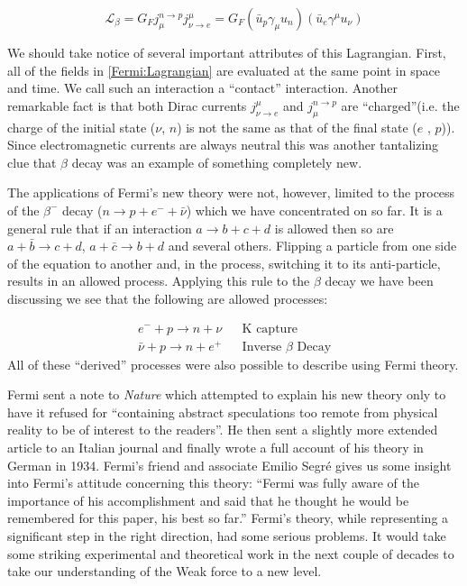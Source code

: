 \documentclass[12pt]{book}
\begin{document}
\begin{equation}\label{Fermi:Lagrangian}
 \mathcal{L}_{\beta}=G_{F}j_{\mu}^{n\rightarrow p}j_{\nu \rightarrow e}^{\mu}=G_{F}\left(\bar{u}_{p}\gamma_{\mu} u_{n}\right)\left(\bar{u}_{e}\gamma^{\mu} u_{\nu}\right)
\end{equation}

We should take notice of several important attributes of this Lagrangian. First, all of the fields in \ref{Fermi:Lagrangian} are evaluated at the same point in space and time. We call such an interaction a ``contact'' interaction. Another remarkable fact is that both Dirac currents $j_{\nu \rightarrow e}^{\mu}$ and $j_{\mu}^{n\rightarrow p}$ are ``charged''(i.e. the charge of the initial state ($\nu$, $n$) is not the same as that of the final state ($e$ , $p$)). Since electromagnetic currents are always neutral this was another tantalizing clue that $\beta$ decay was an example of something completely new\cite{renton}.

The applications of Fermi's new theory were not, however, limited to the process of the $\beta^{-}$ decay ($n\rightarrow p+e^{-}+\bar{\nu}$) which we have concentrated on so far. It is a general rule that if an interaction $a\rightarrow b+c+d$ is allowed then so are $a+\bar{b}\rightarrow c+d$, $a+\bar{c}\rightarrow b+d$ and several others. Flipping a particle from one side of the equation to another and, in the process, switching it to its anti-particle, results in an allowed process. Applying this rule to the $\beta$ decay we have been discussing we see that the following are allowed processes:

\begin{align}
 e^{-}+p \rightarrow n+\nu && \text{K capture} \\
 \bar{\nu}+p \rightarrow n+e^{+} && \text{Inverse } \beta \text{ Decay}
\end{align}
All of these ``derived'' processes were also possible to describe using Fermi theory.

Fermi sent a note to \emph{Nature} which attempted to explain his new theory only to have it refused for  ``containing abstract speculations too remote from physical reality to be of interest to the readers''\cite{rasetti}. He then sent a slightly more extended article to an Italian journal\cite{fermi:italy} and finally wrote a full account of his theory in German\cite{fermi:german} in 1934\cite{brandt}. Fermi's friend and associate Emilio Segr\'{e} gives us some insight into Fermi's attitude concerning this theory\cite{segre}: ``Fermi was fully aware of the importance of his accomplishment and said that he thought he would be remembered for this paper, his best so far.''
Fermi's theory, while representing a significant step in the right direction, had some serious problems. It would take some striking experimental and theoretical work in the next couple of decades to take our understanding of the Weak force to a new level. 
\end{document}
